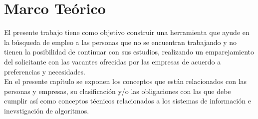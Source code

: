 \chapter{Marco Teórico } %
El presente trabajo tiene como objetivo construir una herramienta que ayude en la búsqueda de empleo a las personas que no se encuentran trabajando y no tienen la posibilidad de continuar con sus estudios, realizando un emparejamiento del solicitante con las vacantes ofrecidas por las empresas de acuerdo a preferencias y necesidades. \\
En el presente capítulo se exponen los conceptos que están relacionados con las personas y empresas, su clasificación y/o las obligaciones con las que debe cumplir así como conceptos técnicos relacionados a los sistemas de información e inevstigación de algoritmos. 
